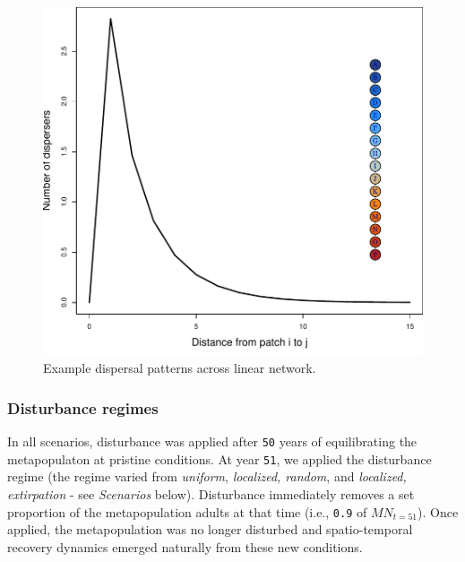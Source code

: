 \documentclass[]{article}
\begin{document}
\begin{figure}[H]

{\centering \includegraphics{Managing_for_ecological_surprises_in_metapopulations_makeHTML_files/figure-latex/dispersal-1} 

}

\caption{Example dispersal patterns across linear network.}\label{fig:dispersal}
\end{figure}

\hypertarget{disturbance-regimes}{%
\subsubsection{Disturbance regimes}\label{disturbance-regimes}}

In all scenarios, disturbance was applied after \texttt{50} years of
equilibrating the metapopulaton at pristine conditions. At year
\texttt{51}, we applied the disturbance regime (the regime varied from
\emph{uniform}, \emph{localized, random}, and \emph{localized,
extirpation} - see \emph{Scenarios} below). Disturbance immediately
removes a set proportion of the metapopulation adults at that time
(i.e., \texttt{0.9} of \(MN_{t=51}\)). Once applied, the metapopulation
was no longer disturbed and spatio-temporal recovery dynamics emerged
naturally from these new conditions.
\end{document}
